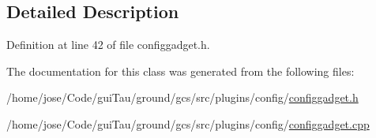 \subsection{Detailed Description}


Definition at line 42 of file configgadget.\-h.



The documentation for this class was generated from the following files\-:\begin{DoxyCompactItemize}
\item 
/home/jose/\-Code/gui\-Tau/ground/gcs/src/plugins/config/\hyperlink{configgadget_8h}{configgadget.\-h}\item 
/home/jose/\-Code/gui\-Tau/ground/gcs/src/plugins/config/\hyperlink{configgadget_8cpp}{configgadget.\-cpp}\end{DoxyCompactItemize}
